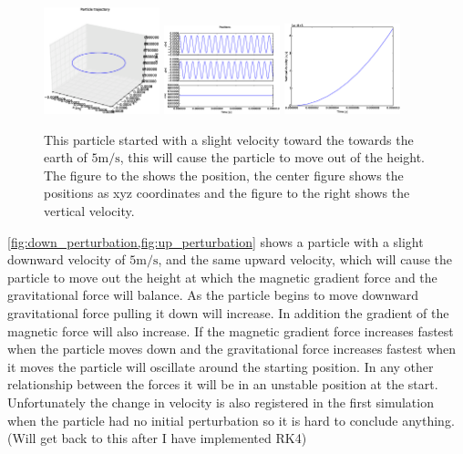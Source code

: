 \documentclass[x11names]{article}
\begin{document}
  \begin{figure}
      \centering
      \includegraphics[width = 0.30\textwidth]{figures/7_5_12_3Dplot}
      \includegraphics[width = 0.30\textwidth]{figures/7_5_12_xyz}
      \includegraphics[width = 0.30\textwidth]{figures/7_5_12_vertical_vel}
      \caption{ This particle started with a slight velocity toward the towards the earth of \(5 \si{\meter\per\second}\), this will cause the particle to move out of the height. The figure to the shows the position, the center figure shows the positions as xyz coordinates and the figure to the right shows the vertical velocity.}
      \label{fig:up_perturbation}
   \end{figure}




  \cref{fig:down_perturbation,fig:up_perturbation} shows a particle with a slight downward velocity of \(5 \si{\meter\per\second}\), and the same upward velocity, which will cause the particle to move out the height at which the magnetic gradient force and the gravitational force will balance. As the particle begins to move downward gravitational force pulling it down will increase. In addition the gradient of the magnetic force will also increase. If the magnetic gradient force increases fastest when the particle moves down and the gravitational force increases fastest when it moves the particle will oscillate around the starting position. In any other relationship between the forces it will be in an unstable position at the start. Unfortunately the change in velocity is also registered in the first simulation when the particle had no initial perturbation so it is hard to conclude anything. (Will get back to this after I have implemented RK4)
\end{document}
